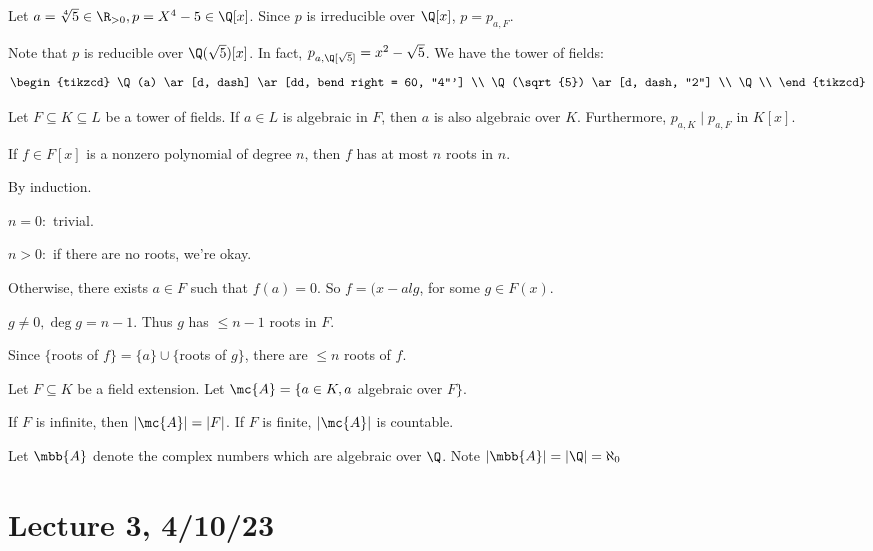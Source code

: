 \documentclass[x11names,reqno,14pt]{extarticle}
\begin{document}
\exm

Let $a = \sqrt[4]{5} \in \R_{>0}, p = X^4 - 5 \in \Q[x]$. Since $p$ is irreducible over $\Q[x]$, $p = p_{a, F}$.

Note that $p$ is reducible over $\Q(\sqrt{5})[x]$. In fact, $p_{a, \Q[\sqrt{5}]} = x^2 - \sqrt{5}$. We have the tower of fields:
\[
\begin{tikzcd}
\Q(a) \ar[d, dash] \ar[dd, bend right = 60, "4"'] \\
\Q(\sqrt{5}) \ar[d, dash, "2"] \\
\Q \\
\end{tikzcd}
\]

Let $F \subseteq K \subseteq L$ be a tower of fields. If $a \in L$ is algebraic in $F$, then $a$ is also algebraic over $K$. Furthermore, $p_{a, K} \mid p_{a, F}$ in $K[x]$. 

\prop

If $f \in F[x]$ is a nonzero polynomial of degree $n$, then $f$ has at most $n$ roots in $n$. 

\proof

By induction.

$n = 0:$ trivial. 

$n > 0:$ if there are no roots, we're okay. 

Otherwise, there exists $a \in F$ such that $f(a) = 0$. So $f = (x-alg$, for some $g \in F(x)$. 

$g \neq0, \deg g = n - 1$. Thus $g$ has $\leq n -1 $ roots in $F$. 

Since $\{$roots of $f\} = \{a\} \cup \{$roots of $g\}$, there are $\leq n$ roots of $f$. 

Let $F \subseteq K$ be a field extension. Let $\mc{A} = \{a\in K, a$ algebraic over $F\}$. 

If $F$ is infinite, then $|\mc{A}| = |F|$. If $F$ is finite, $|\mc{A}|$ is countable. 

Let $\mbb{A}$ denote the complex numbers which are algebraic over $\Q$. Note $|\mbb{A}| = |\Q| = \aleph_0$





\section*{Lecture 3, 4/10/23}
\end{document}
